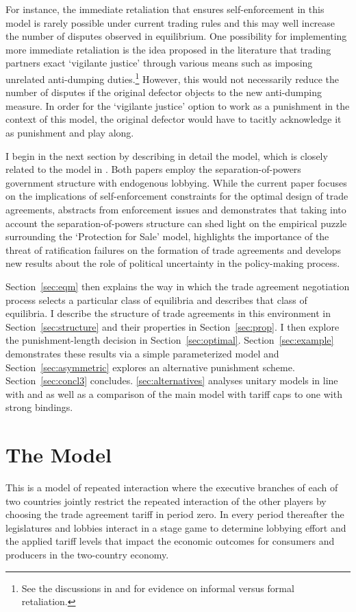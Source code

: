 \documentclass[authoryear, review]{elsarticle}
\begin{document}
For instance, the immediate retaliation that ensures self-enforcement in this model is rarely possible under current trading rules and this may well increase the number of disputes observed in equilibrium. One possibility for implementing more immediate retaliation is the idea proposed in the literature that trading partners exact `vigilante justice' through various means such as imposing unrelated anti-dumping duties.\footnote{See the discussions in \citet{bown2005} and \citet{martinvergote} for evidence on informal versus formal retaliation.} However, this would not necessarily reduce the number of disputes if the original defector objects to the new anti-dumping measure. In order for the `vigilante justice' option to work as a punishment in the context of this model, the original defector would have to tacitly acknowledge it as punishment and play along.

I begin in the next section by describing in detail the model, which is closely related to the model in \citet{buzard2013b}. Both papers employ the separation-of-powers government structure with endogenous lobbying. While the current paper focuses on the implications of self-enforcement constraints for the optimal design of trade agreements, \citet{buzard2013b} abstracts from enforcement issues and demonstrates that taking into account the separation-of-powers structure can shed light on the empirical puzzle surrounding the \citet{gh94} `Protection for Sale' model, highlights the importance of the threat of ratification failures on the formation of trade agreements and develops new results about the role of political uncertainty in the policy-making process.

Section~\ref{sec:eqm} then explains the way in which the trade agreement negotiation process selects a particular class of equilibria and describes that class of equilibria. I describe the structure of trade agreements in this environment in Section~\ref{sec:structure} and their properties in Section~\ref{sec:prop}. I then explore the punishment-length decision in Section~\ref{sec:optimal}. Section~\ref{sec:example} demonstrates these results via a simple parameterized model and Section~\ref{sec:asymmetric} explores an alternative punishment scheme. Section~\ref{sec:concl3} concludes. \ref{sec:alternatives} analyses unitary models in line with \citet{mrc2007} and \citet{dgh97} as well as a comparison of the main model with tariff caps to one with strong bindings.


\section{The Model}
\label{sec:model}
This is a model of repeated interaction where the executive branches of each of two countries jointly restrict the repeated interaction of the other players by choosing the trade agreement tariff in period zero. In every period thereafter the legislatures and lobbies interact in a stage game to determine lobbying effort and the applied tariff levels that impact the economic outcomes for consumers and producers in the two-country economy. 
\end{document}
